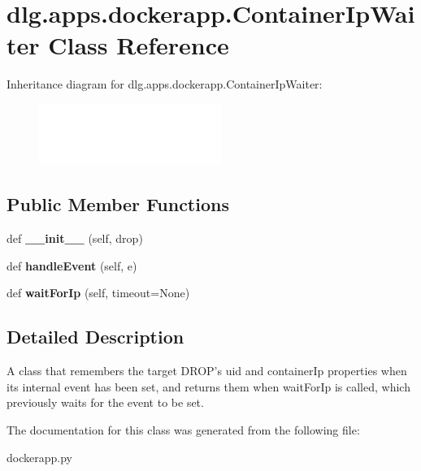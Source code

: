 \hypertarget{classdlg_1_1apps_1_1dockerapp_1_1_container_ip_waiter}{}\section{dlg.\+apps.\+dockerapp.\+Container\+Ip\+Waiter Class Reference}
\label{classdlg_1_1apps_1_1dockerapp_1_1_container_ip_waiter}
Inheritance diagram for dlg.\+apps.\+dockerapp.\+Container\+Ip\+Waiter\+:\begin{figure}[H]
\begin{center}
\leavevmode
\includegraphics[height=2.000000cm]{classdlg_1_1apps_1_1dockerapp_1_1_container_ip_waiter}
\end{center}
\end{figure}
\subsection*{Public Member Functions}
\begin{DoxyCompactItemize}
\item 
\mbox{\label{classdlg_1_1apps_1_1dockerapp_1_1_container_ip_waiter_a7097c4607d86f43d0405958d9edcdb8a}} 
def {\bfseries \+\_\+\+\_\+init\+\_\+\+\_\+} (self, drop)
\item 
\mbox{\label{classdlg_1_1apps_1_1dockerapp_1_1_container_ip_waiter_a83c5a50390191c43c3f4489b67b45016}} 
def {\bfseries handle\+Event} (self, e)
\item 
\mbox{\label{classdlg_1_1apps_1_1dockerapp_1_1_container_ip_waiter_a750b882035afadff2c27584723701133}} 
def {\bfseries wait\+For\+Ip} (self, timeout=None)
\end{DoxyCompactItemize}


\subsection{Detailed Description}
\begin{DoxyVerb}A class that remembers the target DROP's uid and containerIp properties
when its internal event has been set, and returns them when waitForIp is
called, which previously waits for the event to be set.
\end{DoxyVerb}
 

The documentation for this class was generated from the following file\+:\begin{DoxyCompactItemize}
\item 
dockerapp.\+py\end{DoxyCompactItemize}

